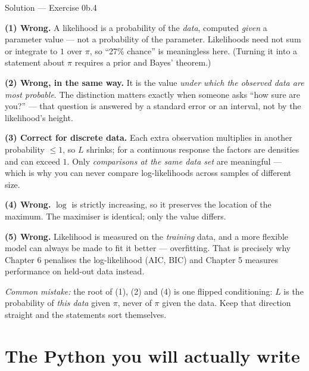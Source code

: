 \documentclass[aspectratio=169,11pt]{beamer}
\begin{document}
\begin{frame}{Solution --- Exercise 0b.4}
  \begin{solutionbox}
    \scriptsize
    \textbf{(1) Wrong.} A likelihood is a probability of the \emph{data},
    computed \emph{given} a parameter value --- not a probability of the
    parameter. Likelihoods need not sum or integrate to $1$ over $\pi$, so
    ``27\% chance'' is meaningless here. (Turning it into a statement about
    $\pi$ requires a prior and Bayes' theorem.)

    \textbf{(2) Wrong, in the same way.} It is the value \emph{under which the
    observed data are most probable}. The distinction matters exactly when
    someone asks ``how sure are you?'' --- that question is answered by a
    standard error or an interval, not by the likelihood's height.

    \textbf{(3) Correct for discrete data.} Each extra observation multiplies
    in another probability $\le 1$, so $L$ shrinks; for a continuous response
    the factors are densities and can exceed $1$. Only \emph{comparisons at
    the same data set} are meaningful ---
    which is why you can never compare log-likelihoods across samples of
    different size.

    \textbf{(4) Wrong.} $\log$ is strictly increasing, so it preserves the
    location of the maximum. The maximiser is identical; only the value
    differs.

    \textbf{(5) Wrong.} Likelihood is measured on the \emph{training} data, and
    a more flexible model can always be made to fit it better --- overfitting.
    That is precisely why Chapter 6 penalises the log-likelihood (AIC, BIC) and
    Chapter 5 measures performance on held-out data instead.

    \medskip
    \textit{Common mistake:} the root of (1), (2) and (4) is one flipped
    conditioning: $L$ is the probability of \emph{this data} given $\pi$,
    never of $\pi$ given the data. Keep that direction straight and the
    statements sort themselves.
  \end{solutionbox}
\end{frame}


\section{The Python you will actually write}
\end{document}
